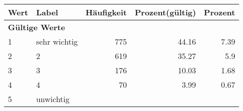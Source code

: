      \begin{longtable}{lXrrr}
     \toprule
     \textbf{Wert} & \textbf{Label} & \textbf{Häufigkeit} & \textbf{Prozent(gültig)} & \textbf{Prozent} \\
     \endhead
     \midrule
     \multicolumn{5}{l}{\textbf{Gültige Werte}}\\

     1 &
     \multicolumn{1}{X}{ sehr wichtig   } &


       \num{775} &
       \num[round-mode=places,round-precision=2]{44,16} &
         \num[round-mode=places,round-precision=2]{7,39} \\

     2 &
     \multicolumn{1}{X}{ 2   } &


       \num{619} &
       \num[round-mode=places,round-precision=2]{35,27} &
         \num[round-mode=places,round-precision=2]{5,9} \\

     3 &
     \multicolumn{1}{X}{ 3   } &


       \num{176} &
       \num[round-mode=places,round-precision=2]{10,03} &
         \num[round-mode=places,round-precision=2]{1,68} \\

     4 &
     \multicolumn{1}{X}{ 4   } &


       \num{70} &
       \num[round-mode=places,round-precision=2]{3,99} &
         \num[round-mode=places,round-precision=2]{0,67} \\

     5 &
     \multicolumn{1}{X}{ unwichtig   } &



\end{longtable}

